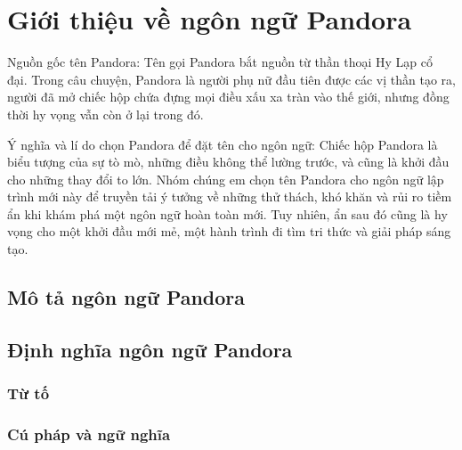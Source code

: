 \section{Giới thiệu về ngôn ngữ Pandora}
Nguồn gốc tên Pandora: 
    Tên gọi Pandora bắt nguồn từ thần thoại 
    Hy Lạp cổ đại. Trong câu chuyện, Pandora là người phụ nữ đầu tiên được 
    các vị thần tạo ra, người đã mở chiếc hộp chứa đựng mọi điều xấu xa tràn 
    vào thế giới, nhưng đồng thời hy vọng vẫn còn ở lại trong đó.

Ý nghĩa và lí do chọn Pandora để đặt tên cho ngôn ngữ: 
    Chiếc hộp Pandora là biểu tượng của sự tò mò, những điều không thể 
    lường trước, và cũng là khởi đầu cho những thay đổi to lớn. Nhóm chúng 
    em chọn tên Pandora cho ngôn ngữ lập trình mới này để truyền tải ý 
    tưởng về những thử thách, khó khăn và rủi ro tiềm ẩn khi khám phá một 
    ngôn ngữ hoàn toàn mới. Tuy nhiên, ẩn sau đó cũng là hy vọng cho một 
    khởi đầu mới mẻ, một hành trình đi tìm tri thức và giải pháp sáng tạo.


\subsection{Mô tả ngôn ngữ Pandora}
\subsection{Định nghĩa ngôn ngữ Pandora}
\subsubsection{Từ tố}

\subsubsection{Cú pháp và ngữ nghĩa}